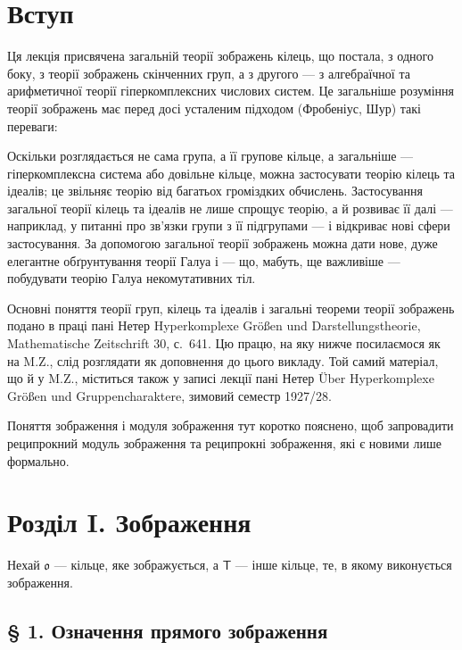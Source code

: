 \documentclass[11pt]{article}
\newcommand{\foreign}[1]{#1}
\begin{document}
\clearpage
\section*{Вступ}\label{einleitung}

Ця лекція присвячена загальній теорії зображень кілець, що постала,
з одного боку, з теорії зображень скінченних груп, а з другого --- з
алгебраїчної та арифметичної теорії гіперкомплексних числових систем.
Це загальніше розуміння теорії зображень має перед досі усталеним
підходом (Фробеніус, Шур) такі переваги:

Оскільки розглядається не сама група, а її групове кільце, а
загальніше --- гіперкомплексна система або довільне кільце, можна
застосувати теорію кілець та ідеалів; це звільняє теорію від багатьох
громіздких обчислень. Застосування загальної теорії кілець та ідеалів
не лише спрощує теорію, а й розвиває її далі --- наприклад, у питанні
про зв'язки групи з її підгрупами --- і відкриває нові сфери
застосування. За допомогою загальної теорії зображень можна дати нове,
дуже елегантне обґрунтування теорії Галуа і --- що, мабуть, ще
важливіше --- побудувати теорію Галуа некомутативних тіл.

Основні поняття теорії груп, кілець та ідеалів і загальні теореми
теорії зображень подано в праці пані Нетер
\foreign{Hyperkomplexe Größen und Darstellungstheorie},
\foreign{Mathematische Zeitschrift} 30, с.~641. Цю працю, на яку нижче
посилаємося як на M.Z., слід розглядати як доповнення до цього викладу.
Той самий матеріал, що й у M.Z., міститься також у записі лекції пані
Нетер \foreign{Über Hyperkomplexe Größen und Gruppencharaktere},
зимовий семестр 1927/28.

Поняття зображення і модуля зображення тут коротко пояснено, щоб
запровадити реципрокний модуль зображення та реципрокні зображення,
які є новими лише формально.

\section*{Розділ I. Зображення}\label{kapitel-i.-darstellungen}

Нехай $\mathfrak{o}$ --- кільце, яке зображується, а $\mathsf T$ ---
інше кільце, те, в якому виконується зображення.

\subsection*{§ 1. Означення прямого зображення}\label{definition-der-direkten-darstellung}
\end{document}
